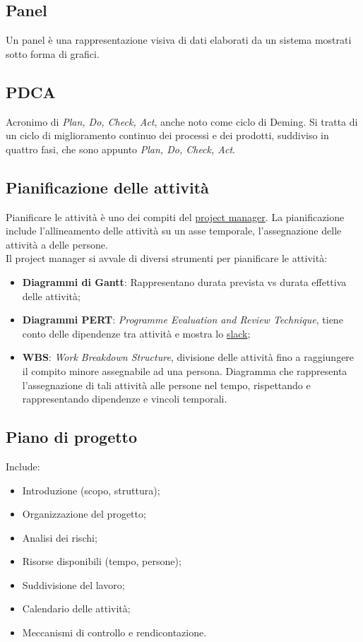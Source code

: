	\newpage


	\subsection{Panel}
	\label{sec:panel}
	Un panel è una rappresentazione visiva di dati elaborati da un sistema mostrati sotto forma di grafici.


	\subsection{PDCA}
	\label{sec:pdca}
	Acronimo di \emph{Plan, Do, Check, Act}, anche noto come ciclo di Deming. Si tratta di un ciclo di miglioramento continuo dei processi e dei prodotti, suddiviso in quattro fasi, che sono appunto \emph{Plan, Do, Check, Act}.


	\subsection{Pianificazione delle attività}
	\label{sec:pianificazioneattivita}
	Pianificare le attività è uno dei compiti del \underline{\hyperref[sec:projectmanager]{project manager}}.
	La pianificazione include l'allineamento delle attività su un asse temporale, l'assegnazione delle attività a delle persone. \\Il project manager si avvale di diversi strumenti per pianificare le attività:
	\begin{itemize}
	\item \textbf{Diagrammi di Gantt}: Rappresentano durata prevista vs durata effettiva delle attività;
	\item \textbf{Diagrammi PERT}: \emph{Programme Evaluation and Review Technique}, tiene conto delle dipendenze tra attività e mostra lo \hyperref[sec:slack]{slack};
	\item \textbf{WBS}: \emph{Work Breakdown Structure}, divisione delle attività fino a raggiungere il compito minore assegnabile ad una persona. Diagramma che rappresenta l'assegnazione di tali attività alle persone nel tempo, rispettando e rappresentando dipendenze e vincoli temporali.
	\end{itemize}


	\subsection{Piano di progetto}
	\label{sec:pianoprogetto}
	Include:
	\begin{itemize}
	\item Introduzione (scopo, struttura);
	\item Organizzazione del progetto;
	\item Analisi dei rischi;
	\item Risorse disponibili (tempo, persone);
	\item Suddivisione del lavoro;
	\item Calendario delle attività;
	\item Meccanismi di controllo e rendicontazione.
	\end{itemize}


